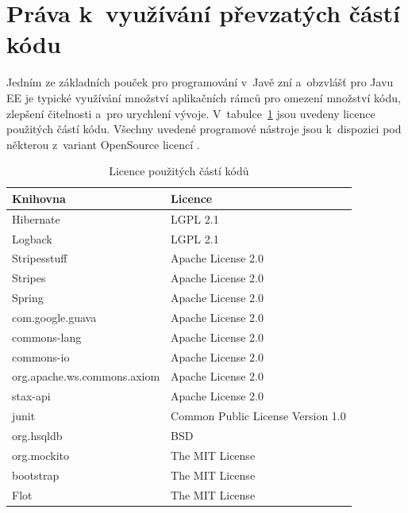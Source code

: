 \documentclass[11pt,draft,oneside]{fithesis2}
\begin{document}
\section{Práva k~využívání převzatých částí kódu}
Jedním ze základních pouček pro programování v~Javě zní  a~obzvlášť pro Javu EE je typické využívání množství aplikačních rámců pro omezení množství kódu, zlepšení čitelnosti a~pro urychlení vývoje. V~tabulce~\ref{tab:libraries:license} jsou uvedeny licence použitých částí kódu.
Všechny uvedené programové nástroje jsou k~dispozici pod některou z~variant OpenSource licencí \cite{Licence}.

\begin{table}[ht] 
\centering
\begin{tabular}{l l}
\hline 
Knihovna & Licence \\
\hline \hline
Hibernate 									& LGPL 2.1 \\
Logback 										& LGPL 2.1 \\
Stripesstuff 								& Apache License 2.0 \\ 
Stripes 										& Apache License 2.0 \\ 
Spring 											& Apache License 2.0 \\ 
com.google.guava 						& Apache License 2.0 \\
commons-lang 								& Apache License 2.0 \\
commons-io 									& Apache License 2.0 \\
org.apache.ws.commons.axiom & Apache License 2.0 \\
stax-api 										& Apache License 2.0 \\
junit 											& Common Public License Version 1.0 \\
org.hsqldb 									& BSD \\
org.mockito 								& The MIT License \\
bootstrap 									& The MIT License \\
Flot 												& The MIT License \\

\hline %
\end{tabular} 
\caption{Licence použitých částí kódů}
\label{tab:libraries:license} %
\end{table} 

\end{document}
